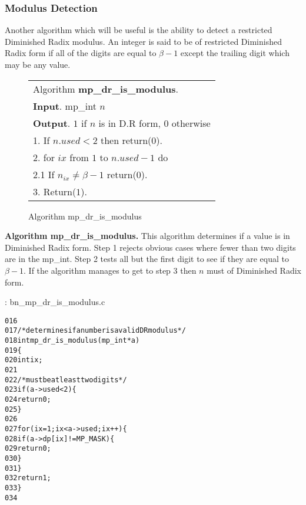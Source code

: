 \documentclass[b5paper]{book}
\begin{document}
\subsubsection{Modulus Detection}
Another algorithm which will be useful is the ability to detect a restricted Diminished Radix modulus.  An integer is said to be
of restricted Diminished Radix form if all of the digits are equal to $\beta - 1$ except the trailing digit which may be any value.

\begin{figure}[!here]
\begin{small}
\begin{center}
\begin{tabular}{l}
\hline Algorithm \textbf{mp\_dr\_is\_modulus}. \\
\textbf{Input}.   mp\_int $n$ \\
\textbf{Output}.  $1$ if $n$ is in D.R form, $0$ otherwise \\
\hline
1.  If $n.used < 2$ then return($0$). \\
2.  for $ix$ from $1$ to $n.used - 1$ do \\
\hspace{3mm}2.1  If $n_{ix} \ne \beta - 1$ return($0$). \\
3.  Return($1$). \\
\hline
\end{tabular}
\end{center}
\end{small}
\caption{Algorithm mp\_dr\_is\_modulus}
\end{figure}

\textbf{Algorithm mp\_dr\_is\_modulus.}
This algorithm determines if a value is in Diminished Radix form.  Step 1 rejects obvious cases where fewer than two digits are
in the mp\_int.  Step 2 tests all but the first digit to see if they are equal to $\beta - 1$.  If the algorithm manages to get to
step 3 then $n$ must of Diminished Radix form.

\vspace{+3mm}\begin{small}
\hspace{-5.1mm}{\bf File}: bn\_mp\_dr\_is\_modulus.c
\vspace{-3mm}
\begin{alltt}
016   
017   /* determines if a number is a valid DR modulus */
018   int mp_dr_is_modulus(mp_int *a)
019   \{
020      int ix;
021   
022      /* must be at least two digits */
023      if (a->used < 2) \{
024         return 0;
025      \}
026   
027      for (ix = 1; ix < a->used; ix++) \{
028          if (a->dp[ix] != MP_MASK) \{
029             return 0;
030          \}
031      \}
032      return 1;
033   \}
034   
\end{alltt}
\end{small}
\end{document}
